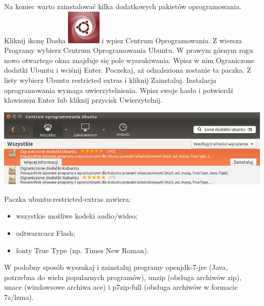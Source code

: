 Na koniec warto zainstalować kilka dodatkowych pakietów oprogramowania. Kliknij ikonę Dasha \includegraphics[scale=0.35]{images/ikony_dash.png} i wpisz \textcolor{ubuntu_orange}{Centrum Oprogramowania}. Z wiersza \textcolor{ubuntu_orange}{Programy} wybierz \textcolor{ubuntu_orange}{Centrum Oprogramowania Ubuntu}. W prawym górnym rogu nowo otwartego okna znajduje się pole wyszukiwania. Wpisz w nim \textcolor{ubuntu_orange}{Ograniczone dodatki Ubuntu} i wciśnij Enter. Poczekaj, aż odnaleziona zostanie ta paczka. Z listy wybierz \textcolor{ubuntu_orange}{Ubuntu restricted extras} i kliknij \textcolor{ubuntu_orange}{Zainstaluj}. Instalacja oprogramowania wymaga uwierzytelnienia. Wpisz swoje hasło i potwierdź klawiszem Enter lub kliknij przycisk \textcolor{ubuntu_orange}{Uwierzytelnij}.
\begin{center}
	\vspace{-10pt}
	\includegraphics[width=\linewidth]{images/pierwsze_uruchomienie_dodatki2.png}
\end{center}

Paczka \textcolor{ubuntu_orange}{ubuntu-restricted-extras} zawiera:
\begin{itemize}
\item wszystkie możliwe kodeki audio/wideo;
\item odtwarzcacz Flash;
\item fonty True Type (np. Times New Roman).
\end{itemize}
W podobny sposób wyszukaj i zainstaluj programy \textcolor{ubuntu_orange}{openjdk-7-jre} (Java, potrzebna do wielu popularnych programów), \textcolor{ubuntu_orange}{unzip} (obsługa archiwów zip), \textcolor{ubuntu_orange}{unace} (windowsowe archiwa ace) i \textcolor{ubuntu_orange}{p7zip-full} (obsługa archiwów w formacie 7z/lzma).
\clearpage
